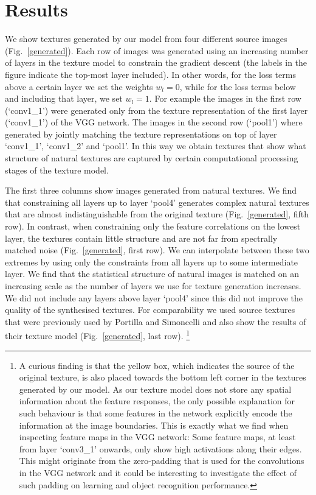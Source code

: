 \documentclass{article} %
\begin{document}
\section{Results}
We show textures generated by our model from four different source images (Fig.~\ref{generated}). Each row of images was generated using an increasing number of layers in the texture model to constrain the gradient descent (the labels in the figure indicate the top-most layer included). In other words, for the loss terms above a certain layer we set the weights $w_l=0$, while for the loss terms below and including that layer, we set $w_l=1$. For example the images in the first row (`conv1\_1') were generated only from the texture representation of the first layer (`conv1\_1') of the VGG network. The images in the second row (`pool1') where generated by jointly matching the texture representations on top of layer `conv1\_1', `conv1\_2' and `pool1'. In this way we obtain textures that show what structure of natural textures are captured by certain computational processing stages of the texture model.

The first three columns show images generated from natural textures. We find that constraining all layers up to layer `pool4' generates complex natural textures that are almost indistinguishable from the original texture (Fig.~\ref{generated}, fifth row). In contrast, when constraining only the feature correlations on the lowest layer, the textures contain little structure and are not far from spectrally matched noise (Fig.~\ref{generated}, first row). We can interpolate between these two extremes by using only the constraints from all layers up to some intermediate layer. We find that the statistical structure of natural images is matched on an increasing scale as the number of layers we use for texture generation increases. We did not include any layers above layer `pool4' since this did not improve the quality of the synthesised textures. For comparability we used source textures that were previously used by Portilla and Simoncelli \cite{portilla_parametric_2000} and also show the results of their texture model (Fig.~\ref{generated}, last row). \footnote{A curious finding is that the yellow box, which indicates the source of the original texture, is also placed towards the bottom left corner in the textures generated by our model. As our texture model does not store any spatial information about the feature responses, the only possible explanation for such behaviour is that some features in the network explicitly encode the information at the image boundaries. This is exactly what we find when inspecting feature maps in the VGG network: Some feature maps, at least from layer `conv3\_1' onwards, only show high activations along their edges. This might originate from the zero-padding that is used for the convolutions in the VGG network and it could be interesting to investigate the effect of such padding on learning and object recognition performance.}
\end{document}
